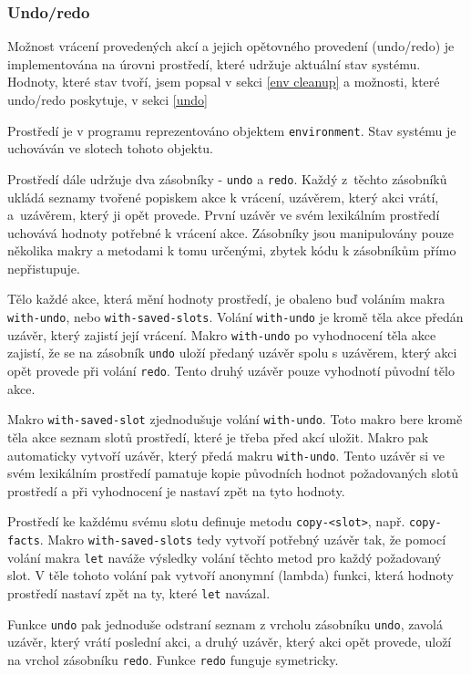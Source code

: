 \subsubsection{Undo/redo}

Možnost vrácení provedených akcí a jejich opětovného provedení (undo/redo) je
implementována na úrovni prostředí, které udržuje aktuální stav systému.
Hodnoty, které stav tvoří, jsem popsal v sekci \ref{env cleanup} a možnosti,
které undo/redo poskytuje, v sekci \ref{undo}

Prostředí je v programu reprezentováno objektem \verb|environment|. Stav
systému je uchováván ve slotech tohoto objektu.

Prostředí dále udržuje dva zásobníky - \verb|undo| a \verb|redo|.
Každý z~těchto zásobníků ukládá seznamy tvořené popiskem akce k vrácení,
uzávěrem, který akci vrátí, a~uzávěrem, který ji opět provede. První uzávěr ve
svém lexikálním prostředí uchovává hodnoty potřebné k vrácení akce. Zásobníky
jsou manipulovány pouze několika makry a metodami k tomu určenými, zbytek kódu k
zásobníkům přímo nepřistupuje.

Tělo každé akce, která mění hodnoty prostředí, je obaleno buď voláním makra
\verb|with-undo|, nebo \verb|with-saved-slots|. Volání \verb|with-undo| je kromě
těla akce předán uzávěr, který zajistí její vrácení. Makro \verb|with-undo|
po vyhodnocení těla akce zajistí, že se na zásobník \verb|undo| uloží předaný
uzávěr spolu s uzávěrem, který akci opět provede při volání \verb|redo|.
Tento druhý uzávěr pouze vyhodnotí původní tělo akce.

Makro \verb|with-saved-slot| zjednodušuje volání \verb|with-undo|. Toto makro
bere kromě těla akce seznam slotů prostředí, které je třeba před akcí uložit.
Makro pak automaticky vytvoří uzávěr, který předá makru \verb|with-undo|. Tento
uzávěr si ve svém lexikálním prostředí pamatuje kopie původních hodnot požadovaných
slotů prostředí a při vyhodnocení je nastaví zpět na tyto hodnoty.

Prostředí ke každému svému slotu definuje metodu \verb|copy-<slot>|, např.
\verb|copy-facts|. Makro \verb|with-saved-slots| tedy vytvoří potřebný uzávěr
tak, že pomocí volání makra \verb|let| naváže výsledky volání těchto metod pro
každý požadovaný slot. V těle tohoto volání pak vytvoří anonymní (lambda)
funkci, která hodnoty prostředí nastaví zpět na ty, které \verb|let| navázal.

Funkce \verb|undo| pak jednoduše odstraní seznam z vrcholu zásobníku
\verb|undo|, zavolá uzávěr, který vrátí poslední akci, a druhý uzávěr, který akci
opět provede, uloží na vrchol zásobníku \verb|redo|. Funkce \verb|redo| funguje
symetricky.


